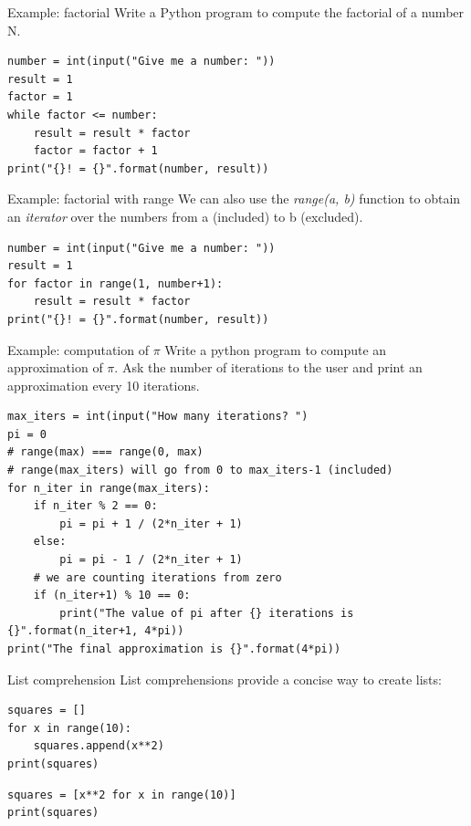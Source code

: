 \documentclass[aspectratio=169,]{beamer}
\begin{document}
\begin{frame}[fragile]{Example: factorial}
    Write a Python program to compute the factorial of a number N.
    \pause

    \begin{verbatim}
number = int(input("Give me a number: "))
result = 1
factor = 1
while factor <= number:
    result = result * factor
    factor = factor + 1
print("{}! = {}".format(number, result))
    \end{verbatim}
\end{frame}

\begin{frame}[fragile]{Example: factorial with range}
    We can also use the \emph{range(a, b)} function to obtain an \emph{iterator} over the numbers from a (included) to b
    (excluded).
    \begin{verbatim}
number = int(input("Give me a number: "))
result = 1
for factor in range(1, number+1):
    result = result * factor
print("{}! = {}".format(number, result))
    \end{verbatim}
\end{frame}

\begin{frame}[fragile]{Example: computation of $\pi$}
    Write a python program to compute an approximation of $\pi$.
    Ask the number of iterations to the user and print an approximation every 10 iterations.

    \pause
    \begin{verbatim}
max_iters = int(input("How many iterations? ")
pi = 0
# range(max) === range(0, max)
# range(max_iters) will go from 0 to max_iters-1 (included)
for n_iter in range(max_iters):
    if n_iter % 2 == 0:
        pi = pi + 1 / (2*n_iter + 1)
    else:
        pi = pi - 1 / (2*n_iter + 1)
    # we are counting iterations from zero
    if (n_iter+1) % 10 == 0:
        print("The value of pi after {} iterations is {}".format(n_iter+1, 4*pi))
print("The final approximation is {}".format(4*pi))
    \end{verbatim}
\end{frame}

\begin{frame}[fragile]{List comprehension}
    List comprehensions provide a concise way to create lists:

    \begin{minipage}{0.49\textwidth}
    \begin{verbatim}
squares = []
for x in range(10):
    squares.append(x**2)
print(squares)
    \end{verbatim}
    \end{minipage}
    \begin{minipage}{0.49\textwidth}
    \begin{verbatim}
squares = [x**2 for x in range(10)]
print(squares)
    \end{verbatim}
    \end{minipage}
\end{frame}
\end{document}
